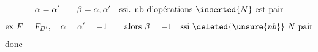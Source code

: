 \[\alpha=\alpha'\qquad\beta=\alpha,\alpha'\quad\text{ssi. nb d'opérations }\inserted{N}\text{ est pair}\]
\[\text{ex }F=F_{D'},\quad\alpha=\alpha'=-1\qquad\text{alors }\beta=-1\quad\text{ssi }\deleted{\unsure{nb}}\ N\text{ pair}\]
 donc

